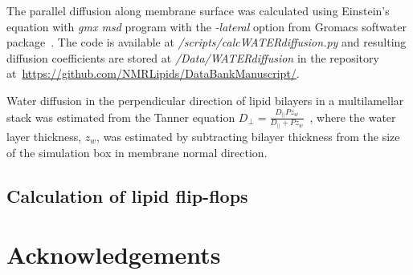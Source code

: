 \documentclass[fleqn,10pt]{wlscirep}
\begin{document}
The parallel diffusion along membrane surface was calculated using Einstein's equation with {\it gmx msd} program with the {\it -lateral} option from Gromacs softwater package~\cite{gromacsMANUAL}. The code is available at {\it /scripts/calcWATERdiffusion.py} and resulting diffusion coefficients are stored at {\it /Data/WATERdiffusion} in the repository at~\url{https://github.com/NMRLipids/DataBankManuscript/}.

Water diffusion in the perpendicular direction of lipid bilayers in a multilamellar stack was estimated from the Tanner equation $D_\perp = \frac{D_{||} P z_w}{D_{||} + P z_w}$~\cite{tanner78,wasterby02}, where the water layer thickness, $z_w$, was estimated by subtracting bilayer thickness from the size of the simulation box in membrane normal direction.

\subsection{Calculation of lipid flip-flops}










\section*{Acknowledgements}

\end{document}
